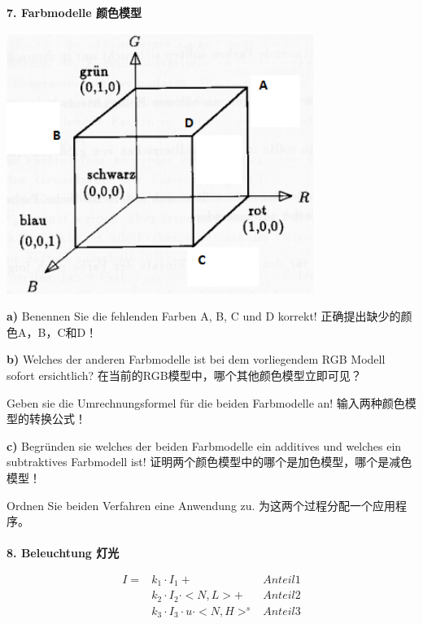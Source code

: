 \documentclass[fleqn]{article}
\begin{document}
\noindent\textbf{7. Farbmodelle 颜色模型}

\begin{center}
    \includegraphics[scale=0.6]{8.png}
\end{center}

\indent\textbf{a)} Benennen Sie die fehlenden Farben A, B, C und D korrekt!
正确提出缺少的颜色A，B，C和D！

\indent\textbf{b)} Welches der anderen Farbmodelle ist bei dem vorliegendem RGB Modell sofort ersichtlich? 
在当前的RGB模型中，哪个其他颜色模型立即可见？

\indent\indent Geben sie die Umrechnungsformel für die beiden Farbmodelle an!
输入两种颜色模型的转换公式！

\indent\textbf{c)} Begründen sie welches der beiden Farbmodelle ein additives und welches ein subtraktives Farbmodell ist! 
证明两个颜色模型中的哪个是加色模型，哪个是减色模型！

\indent\indent Ordnen Sie beiden Verfahren eine Anwendung zu. 为这两个过程分配一个应用程序。
\\
\\
\noindent\textbf{8. Beleuchtung 灯光}
\begin{center}
    \begin{equation}
        \begin{aligned}
            I=& k_1\cdot I_1 + & Anteil 1\\
            & k_2\cdot I_2\cdot <N,L>+ & Anteil 2\\
            & k_3\cdot I_3\cdot u \cdot <N,H>^s & Anteil 3
        \end{aligned}
    \end{equation}
\end{center}
\end{document}
